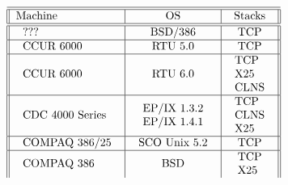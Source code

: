 \[
\begin{tabular}[h]{||l|c|c||}
\hline
\hline
Machine & OS & Stacks \\
\hline
\hline
\begin{tabular}{l} ??? \end{tabular} & \begin{tabular}{l}  BSD/386 \end{tabular} & \begin{tabular}{l} TCP \end{tabular} \\
\hline
\begin{tabular}{l} CCUR 6000 \end{tabular} & \begin{tabular}{l}  RTU 5.0 \end{tabular} & \begin{tabular}{l} TCP \end{tabular} \\
\hline
\begin{tabular}{l} CCUR 6000 \end{tabular} & \begin{tabular}{l}  RTU 6.0 \end{tabular} & \begin{tabular}{l} TCP\\X25\\CLNS \end{tabular} \\
\hline
\begin{tabular}{l} CDC 4000 Series  \end{tabular} & \begin{tabular}{l} EP/IX 1.3.2\\ EP/IX 1.4.1 \end{tabular} & \begin{tabular}{l} TCP\\CLNS\\X25 \end{tabular} \\
\hline
\begin{tabular}{l} COMPAQ 386/25 \end{tabular} & \begin{tabular}{l} 	SCO Unix 5.2 \end{tabular} & \begin{tabular}{l} TCP \end{tabular} \\
\hline
\begin{tabular}{l} COMPAQ 386 \end{tabular} & \begin{tabular}{l} 	BSD \end{tabular} & \begin{tabular}{l} TCP\\X25 \end{tabular} \\

\end{tabular}\]
